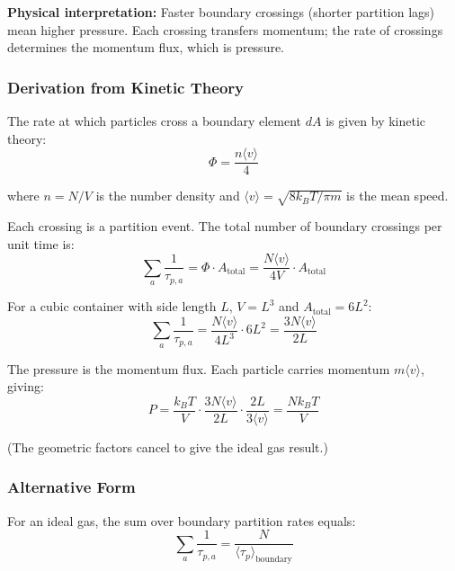 \textbf{Physical interpretation:} Faster boundary crossings (shorter partition lags) mean higher pressure. Each crossing transfers momentum; the rate of crossings determines the momentum flux, which is pressure.

\subsubsection{Derivation from Kinetic Theory}

The rate at which particles cross a boundary element $dA$ is given by kinetic theory:
\begin{equation}
\Phi = \frac{n \langle v \rangle}{4}
\end{equation}

where $n = N/V$ is the number density and $\langle v \rangle = \sqrt{8k_B T/\pi m}$ is the mean speed.

Each crossing is a partition event. The total number of boundary crossings per unit time is:
\begin{equation}
\sum_a \frac{1}{\tau_{p,a}} = \Phi \cdot A_{\text{total}} = \frac{N \langle v \rangle}{4V} \cdot A_{\text{total}}
\end{equation}

For a cubic container with side length $L$, $V = L^3$ and $A_{\text{total}} = 6L^2$:
\begin{equation}
\sum_a \frac{1}{\tau_{p,a}} = \frac{N \langle v \rangle}{4L^3} \cdot 6L^2 = \frac{3N \langle v \rangle}{2L}
\end{equation}

The pressure is the momentum flux. Each particle carries momentum $m\langle v \rangle$, giving:
\begin{equation}
P = \frac{k_B T}{V} \cdot \frac{3N \langle v \rangle}{2L} \cdot \frac{2L}{3\langle v \rangle} = \frac{Nk_B T}{V}
\end{equation}

(The geometric factors cancel to give the ideal gas result.)

\subsubsection{Alternative Form}

For an ideal gas, the sum over boundary partition rates equals:
\begin{equation}
\sum_a \frac{1}{\tau_{p,a}} = \frac{N}{\langle\tau_p\rangle_{\text{boundary}}}
\end{equation}

